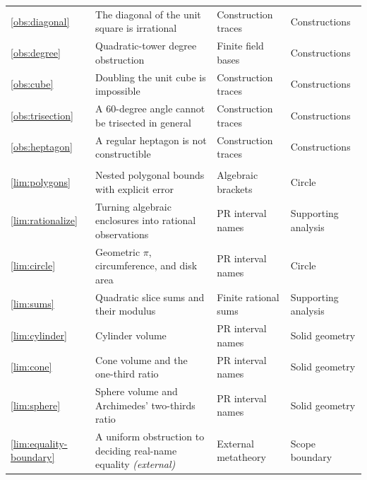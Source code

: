 {\begin{longtable}{@{}>{\raggedright\arraybackslash}p{}>{\raggedright\arraybackslash}p{}>{\raggedright\arraybackslash}p{}>{\raggedright\arraybackslash}p{}@{}}
\ref{obs:diagonal} & The diagonal of the unit square is irrational & Construction traces & Constructions\\
\ref{obs:degree} & Quadratic-tower degree obstruction & Finite field bases & Constructions\\
\ref{obs:cube} & Doubling the unit cube is impossible & Construction traces & Constructions\\
\ref{obs:trisection} & A $60$-degree angle cannot be trisected in general & Construction traces & Constructions\\
\ref{obs:heptagon} & A regular heptagon is not constructible & Construction traces & Constructions\\
\multicolumn{4}{@{}l}{\textbf{Finite observations and boundary} (8 declarations)}\\*[2pt]
\ref{lim:polygons} & Nested polygonal bounds with explicit error & Algebraic brackets & Circle\\
\ref{lim:rationalize} & Turning algebraic enclosures into rational observations & PR interval names & Supporting analysis\\
\ref{lim:circle} & Geometric $\pi$, circumference, and disk area & PR interval names & Circle\\
\ref{lim:sums} & Quadratic slice sums and their modulus & Finite rational sums & Supporting analysis\\
\ref{lim:cylinder} & Cylinder volume & PR interval names & Solid geometry\\
\ref{lim:cone} & Cone volume and the one-third ratio & PR interval names & Solid geometry\\
\ref{lim:sphere} & Sphere volume and Archimedes' two-thirds ratio & PR interval names & Solid geometry\\
\ref{lim:equality-boundary} & A uniform obstruction to deciding real-name equality \emph{(external)} & External metatheory & Scope boundary\\
\end{longtable}
}
